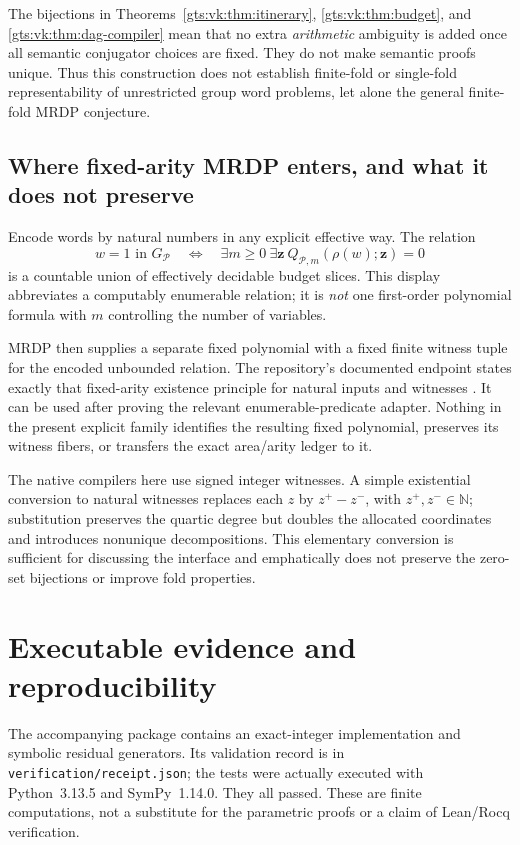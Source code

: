 \documentclass[11pt,letterpaper]{article}
\theoremstyle{definition}
\theoremstyle{remark}
\newcommand{\N}{\mathbb N}
\newcommand{\Pp}{\mathcal P}
\begin{document}
The bijections in Theorems~\ref{gts:vk:thm:itinerary}, \ref{gts:vk:thm:budget}, and \ref{gts:vk:thm:dag-compiler} mean that no extra \emph{arithmetic} ambiguity is added once all semantic conjugator choices are fixed. They do not make semantic proofs unique. Thus this construction does not establish finite-fold or single-fold representability of unrestricted group word problems, let alone the general finite-fold MRDP conjecture.

\subsection{Where fixed-arity MRDP enters, and what it does not preserve}

Encode words by natural numbers in any explicit effective way. The relation
\[
 w=1\text{ in }G_{\Pp}
 \quad\Longleftrightarrow\quad
 \exists m\geq0\ \exists\boldsymbol z\ 
 Q_{\Pp,m}(\rho(w);\boldsymbol z)=0
\]
is a countable union of effectively decidable budget slices. This display abbreviates a computably enumerable relation; it is \emph{not} one first-order polynomial formula with $m$ controlling the number of variables.

MRDP then supplies a separate fixed polynomial with a fixed finite witness tuple for the encoded unbounded relation. The repository's documented endpoint states exactly that fixed-arity existence principle for natural inputs and witnesses \cite{repo-mrdp}. It can be used after proving the relevant enumerable-predicate adapter. Nothing in the present explicit family identifies the resulting fixed polynomial, preserves its witness fibers, or transfers the exact area/arity ledger to it.

The native compilers here use signed integer witnesses. A simple existential conversion to natural witnesses replaces each $z$ by $z^+-z^-$, with $z^+,z^-\in\N$; substitution preserves the quartic degree but doubles the allocated coordinates and introduces nonunique decompositions. This elementary conversion is sufficient for discussing the interface and emphatically does not preserve the zero-set bijections or improve fold properties.

\section{Executable evidence and reproducibility}\label{gts:vk:sec:software}

The accompanying package contains an exact-integer implementation and symbolic residual generators. Its validation record is in
\texttt{verification/receipt.json}; the tests were actually executed with Python~3.13.5 and SymPy~1.14.0. They all passed. These are finite computations, not a substitute for the parametric proofs or a claim of Lean/Rocq verification.
\end{document}
